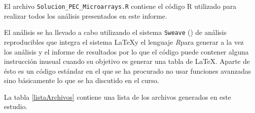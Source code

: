 \documentclass[a4paper]{article}\usepackage[]{graphicx}\usepackage[]{color}
\newcommand{\R}{{\it R}}
\begin{document}




El archivo \texttt{Solucion_PEC_Microarrays.R} contiene el código R utilizado para realizar todos los análisis presentados en este informe.

El análisis se ha llevado a cabo utilizando el sistema \texttt{Sweave} (\cite{Leisch:2002a, Leisch:2002b}) de análisis reproducibles que integra el sistema \LaTeX y el lenguaje \R para generar a la vez los análisis y el informe de resultados por lo que el código puede contener alguna instrucción inusual cuando su objetivo es generar una tabla de \LaTeX. Aparte de ésto es un código estándar en el que se ha procurado no usar funciones avanzadas sino básicamente lo que se ha discutido en el curso.


La tabla \ref{listaArchivos} contiene una lista de los archivos generados en este estudio. 
\end{document}
